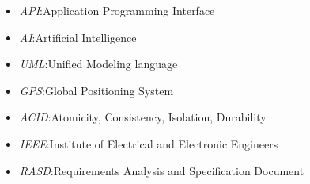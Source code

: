 \begin{itemize}
	
\item \textit{API}:\@ Application Programming Interface
\item \textit{AI}:\@ Artificial Intelligence
\item \textit{UML}:\@ Unified Modeling language
\item \textit{GPS}:\@ Global Positioning System
\item \textit{ACID}:\@ Atomicity, Consistency, Isolation, Durability
\item \textit{IEEE}:\@ Institute of Electrical and Electronic Engineers
\item \textit{RASD}:\@ Requirements Analysis and Specification Document

\end{itemize}